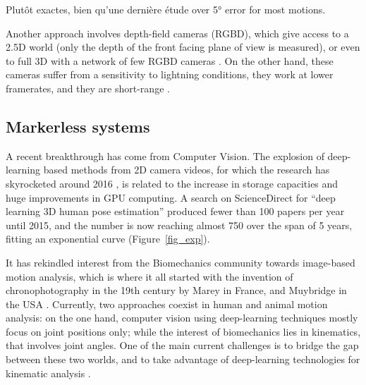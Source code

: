 Plutôt exactes, bien qu'une dernière étude \cite{Rekant2022} over 5° error for most motions.

Another approach involves depth-field cameras (RGBD), which give access to a 2.5D world (only the depth of the front facing plane of view is measured), or even to full 3D with a network of few RGBD cameras \cite{Carraro2017,Choppin2013,Colombel2020}. On the other hand, these cameras suffer from a sensitivity to lightning conditions, they work at lower framerates, and they are short-range \cite{Han2013}. 

\subsection{Markerless systems}

A recent breakthrough has come from Computer Vision. The explosion of deep-learning based methods from 2D camera videos, for which the research has skyrocketed around 2016 \cite{Wang2021a}, is related to the increase in storage capacities and huge improvements in GPU computing. A search on ScienceDirect for “deep learning 3D human pose estimation” produced fewer than 100 papers per year until 2015, and the number is now reaching almost 750 over the span of 5 years, fitting an exponential curve (Figure~\ref{fig_exp}).

It has rekindled interest from the Biomechanics community towards image-based motion analysis, which is where it all started with the invention of chronophotography in the 19th century by Marey in France, and Muybridge in the USA \cite{Baker2007}. Currently, two approaches coexist in human and animal motion analysis: on the one hand, computer vision using deep-learning techniques mostly focus on joint positions only; while the interest of biomechanics lies in kinematics, that involves joint angles. One of the main current challenges is to bridge the gap between these two worlds, and to take advantage of deep-learning technologies for kinematic analysis \cite{Cronin2021,Seethapathi2019}. 

